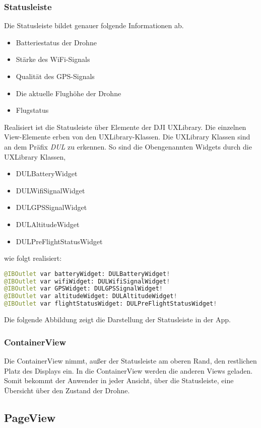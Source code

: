 \subsubsection{Statusleiste}
Die Statusleiste bildet genauer folgende Informationen ab. 
\begin{itemize}
	\item Batteriestatus der Drohne
	\item Stärke des WiFi-Signals
	\item Qualität des GPS-Signals
	\item Die aktuelle Flughöhe der Drohne 
	\item Flugstatus
\end{itemize}
Realisiert ist die Statusleiste über Elemente der DJI UXLibrary. Die einzelnen View-Elemente erben von den UXLibrary-Klassen. Die UXLibrary Klassen sind an dem Präfix \textit{\textit{DUL}} zu erkennen. So sind die Obengenannten Widgets durch die UXLibrary Klassen,
\begin{itemize}
	\item DULBatteryWidget
	\item DULWifiSignalWidget
	\item DULGPSSignalWidget
	\item DULAltitudeWidget
	\item DULPreFlightStatusWidget
\end{itemize}
wie folgt realisiert:
\newline
\begin{lstlisting}[language=python, caption={Statusleiste}]
@IBOutlet var batteryWidget: DULBatteryWidget!
@IBOutlet var wifiWidget: DULWifiSignalWidget!
@IBOutlet var GPSWidget: DULGPSSignalWidget!
@IBOutlet var altitudeWidget: DULAltitudeWidget!
@IBOutlet var flightStatusWidget: DULPreFlightStatusWidget!
\end{lstlisting}
Die folgende Abbildung zeigt die Darstellung der Statusleiste in der App.
\subsubsection{ContainerView}
Die ContainerView nimmt, außer der Statusleiste am oberen Rand, den restlichen Platz des Displays ein. In die ContainerView werden die anderen Views geladen. Somit bekommt der Anwender in jeder Ansicht, über die Statusleiste, eine Übersicht über den Zustand der Drohne.  
\subsection{PageView}
